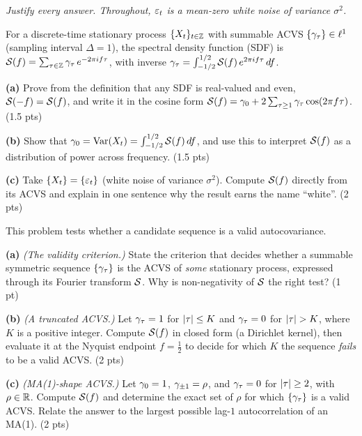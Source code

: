 \documentclass[11pt]{article}
\begin{document}
\pointstable
\begin{center}\itshape Justify every answer. Throughout, $\varepsilon_t$ is a mean-zero white noise of variance $\sigma^2$.\end{center}

For a discrete-time stationary process $\{X_t\}_{t\in\mathbb{Z}}$ with summable ACVS $\{\gamma_\tau\}\in\ell^1$ (sampling interval $\Delta=1$), the spectral density function (SDF) is $\mathcal{S}(f)=\sum_{\tau\in\mathbb{Z}}\gamma_\tau\,e^{-2\pi i f\tau}$, with inverse $\gamma_\tau=\int_{-1/2}^{1/2}\mathcal{S}(f)\,e^{2\pi i f\tau}\,df$.

\textbf{(a)} Prove from the definition that any SDF is real-valued and even, $\mathcal{S}(-f)=\mathcal{S}(f)$, and write it in the cosine form $\mathcal{S}(f)=\gamma_0+2\sum_{\tau\ge1}\gamma_\tau\cos(2\pi f\tau)$. \hfill(1.5 pts)

\textbf{(b)} Show that $\gamma_0=\operatorname{Var}(X_t)=\int_{-1/2}^{1/2}\mathcal{S}(f)\,df$, and use this to interpret $\mathcal{S}(f)$ as a distribution of power across frequency. \hfill(1.5 pts)

\textbf{(c)} Take $\{X_t\}=\{\varepsilon_t\}$ (white noise of variance $\sigma^2$). Compute $\mathcal{S}(f)$ directly from its ACVS and explain in one sentence why the result earns the name ``white''. \hfill(2 pts)
\answerpage

This problem tests whether a candidate sequence is a valid autocovariance.

\textbf{(a)} \emph{(The validity criterion.)} State the criterion that decides whether a summable symmetric sequence $\{\gamma_\tau\}$ is the ACVS of \emph{some} stationary process, expressed through its Fourier transform $\mathcal{S}$. Why is non-negativity of $\mathcal{S}$ the right test? \hfill(1 pt)

\textbf{(b)} \emph{(A truncated ACVS.)} Let $\gamma_\tau=1$ for $\left\lvert \tau \right\rvert\le K$ and $\gamma_\tau=0$ for $\left\lvert \tau \right\rvert>K$, where $K$ is a positive integer. Compute $\mathcal{S}(f)$ in closed form (a Dirichlet kernel), then evaluate it at the Nyquist endpoint $f=\tfrac12$ to decide for which $K$ the sequence \emph{fails} to be a valid ACVS. \hfill(2 pts)

\textbf{(c)} \emph{(MA(1)-shape ACVS.)} Let $\gamma_0=1$, $\gamma_{\pm1}=\rho$, and $\gamma_\tau=0$ for $\left\lvert \tau \right\rvert\ge2$, with $\rho\in\mathbb{R}$. Compute $\mathcal{S}(f)$ and determine the exact set of $\rho$ for which $\{\gamma_\tau\}$ is a valid ACVS. Relate the answer to the largest possible lag-$1$ autocorrelation of an MA(1). \hfill(2 pts)
\answerpage
\end{document}
